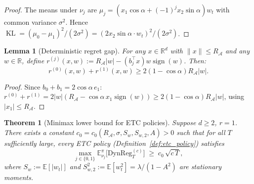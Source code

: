 \documentclass{article}
\newcommand{\R}{\mathbb{R}}
\newcommand{\E}{\mathbb{E}}
\DeclareMathOperator{\sign}{sign}
\newcommand{\cA}{\mathcal{A}}
\newcommand{\DynReg}{\mathrm{DynReg}}
\DeclareMathOperator{\KL}{KL}
\newtheorem{lemma}{Lemma}
\newtheorem{theorem}{Theorem}
\begin{document}
\begin{proof}
The means under $\nu_j$ are $\mu_j = (x_1\cos\alpha+(-1)^j x_2\sin\alpha)w_t$ with common variance $\sigma^2$.
Hence $\KL = (\mu_0-\mu_1)^2/(2\sigma^2) = (2x_2\sin\alpha\cdot w_t)^2/(2\sigma^2)$.
\end{proof}

\begin{lemma}[Deterministic regret gap]
\label{lem:regret_gap_det}
For any $x\in\R^d$ with $\|x\|\le R_{\cA}$ and any $w\in\R$, define $r^{(j)}(x,w) := R_{\cA}|w| - (b_j^\top x)w\sign(w)$.  Then:
\[
r^{(0)}(x,w) + r^{(1)}(x,w) \ge 2(1-\cos\alpha)R_{\cA}|w|.
\]
\end{lemma}

\begin{proof}
Since $b_0 + b_1 = 2\cos\alpha\,e_1$: $r^{(0)}+r^{(1)} = 2|w|(R_{\cA} - \cos\alpha\,x_1\sign(w)) \ge 2(1-\cos\alpha)R_{\cA}|w|$, using $|x_1|\le R_{\cA}$.
\end{proof}

\begin{theorem}[Minimax lower bound for ETC policies]
\label{thm:etc_lower_bound}
Suppose $d \ge 2$, $r = 1$.  There exists a constant $c_0 = c_0(R_{\cA},\sigma,S_w,S_{w,2},A) > 0$ such that for all $T$ sufficiently large, every ETC policy (Definition~\ref{def:etc_policy}) satisfies
\begin{equation}
\label{eq:etc_lower_bound}
  \max_{j \in \{0,1\}}
  \E_{\nu_j}^\pi\bigl[\DynReg_T^{(c)}\bigr]
  \;\ge\; c_0\,\sqrt{c\,T},
\end{equation}
where $S_w := \E[|w_t|]$ and $S_{w,2}^2 := \E[w_t^2] = \lambda/(1-A^2)$ are stationary moments.
\end{theorem}
\end{document}
